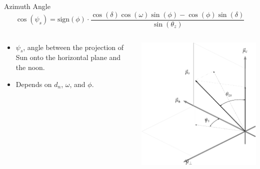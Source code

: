 \documentclass[xcolor={usenames,svgnames,dvipsnames}]{beamer}
\begin{document}
\begin{frame}[label={sec:org749a002},plain]{Azimuth Angle}
\[
  \boxed{\cos(\psi_{s}) = \mathrm{sign}(\phi) \cdot \frac{\cos(\delta) \cos(\omega) \sin(\phi) - \cos(\phi) \sin(\delta)} {\sin(\theta_{z})}}
\]

\begin{columns}
\begin{column}{0.6\columnwidth}
\begin{itemize}
\item \(\psi_s\), angle between the projection of Sun onto the horizontal plane and the noon.
\item Depends on \(d_n\), \(\omega\), and \(\phi\).
\end{itemize}
\end{column}

\begin{column}{0.7\columnwidth}
\begin{center}
\includegraphics[width=.9\linewidth]{../figs/SistemaCoordenadasLocal-crop.pdf}
\end{center}
\end{column}
\end{columns}
\end{frame}
\end{document}
